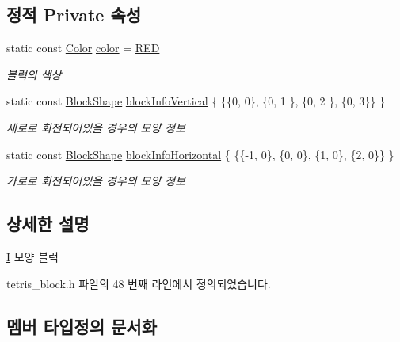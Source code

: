 \subsection*{정적 Private 속성}
\begin{DoxyCompactItemize}
\item 
static const \mbox{\hyperlink{class_block_ad054b4ac51df79aa910040b2a2fdf7b5}{Color}} \mbox{\hyperlink{class_i_a526ab692f8757d9d3ff3da5ca231b8a0}{color}} = \mbox{\hyperlink{class_block_ad054b4ac51df79aa910040b2a2fdf7b5ac3d067e89682bb3d91db42beb7c68062}{R\+ED}}
\begin{DoxyCompactList}\small\item\em 블럭의 색상 \end{DoxyCompactList}\item 
static const \mbox{\hyperlink{class_block_aca5d951639f113e2ebd7856209d6b9ab}{Block\+Shape}} \mbox{\hyperlink{class_i_a78fdc2abb810f708c2595846c74ad1ca}{block\+Info\+Vertical}} \{ \{\{0, 0\}, \{0, 1 \}, \{0, 2 \}, \{0, 3\}\} \}
\begin{DoxyCompactList}\small\item\em 세로로 회전되어있을 경우의 모양 정보 \end{DoxyCompactList}\item 
static const \mbox{\hyperlink{class_block_aca5d951639f113e2ebd7856209d6b9ab}{Block\+Shape}} \mbox{\hyperlink{class_i_af8e5eabbd3a5e1fef9066d3a6fa44adc}{block\+Info\+Horizontal}} \{ \{\{-\/1, 0\}, \{0, 0\}, \{1, 0\}, \{2, 0\}\} \}
\begin{DoxyCompactList}\small\item\em 가로로 회전되어있을 경우의 모양 정보 \end{DoxyCompactList}\end{DoxyCompactItemize}


\subsection{상세한 설명}
\mbox{\hyperlink{class_i}{I}} 모양 블럭 

tetris\+\_\+block.\+h 파일의 48 번째 라인에서 정의되었습니다.



\subsection{멤버 타입정의 문서화}
\mbox{\label{class_block_aca5d951639f113e2ebd7856209d6b9ab}} 
